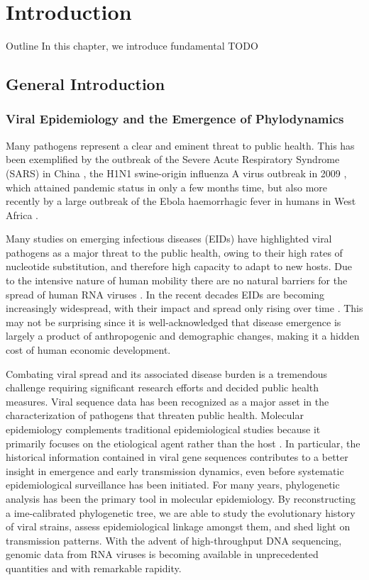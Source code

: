 \chapter{Introduction}

\begin{remark}{Outline}
In this chapter, we introduce fundamental 
TODO
\end{remark}

\section{General Introduction}

\subsection{Viral Epidemiology and the Emergence of Phylodynamics\label{sub:epidemiology}}

Many pathogens represent a clear and eminent threat to public health. 
This has been exemplified by 
the outbreak of the Severe Acute Respiratory Syndrome (SARS) in China \citep{Ksiazek2003},
the H1N1 swine-origin influenza A virus outbreak in 2009 \citep{Fraser2009},
which attained pandemic status in only a few months time, but also more recently by a large outbreak of the Ebola haemorrhagic fever in humans in West Africa \citep{Dudas2014}. 

Many studies on emerging infectious diseases (EIDs) have highlighted viral pathogens as a major threat to the public health, owing to their high rates of nucleotide substitution, and therefore high capacity to adapt to new hosts. 
Due to the intensive nature of human mobility there are no natural barriers for the spread of human RNA viruses \citep{Brockmann2006}.
In the recent decades EIDs are becoming increasingly widespread, with their impact and spread only rising over time \citep{Jones2008}.
This may not be surprising since it is well-acknowledged that disease emergence is largely a product of anthropogenic and demographic changes, making it a hidden cost of human economic development.
 
Combating viral spread and its associated disease burden is a tremendous challenge requiring significant research efforts and decided public health measures. 
Viral sequence data has been recognized as a major asset in the characterization of pathogens that threaten public health.
Molecular epidemiology complements traditional epidemiological studies because it primarily focuses on the etiological agent rather than the host \citep{Leitner2002}.
In particular, the historical information contained in viral gene sequences contributes to a better insight in emergence and early transmission dynamics, even before systematic epidemiological surveillance has been initiated. 
For many years, phylogenetic analysis has been the primary tool in molecular epidemiology. 
By reconstructing a ime-calibrated phylogenetic tree, we are able to study the evolutionary history of viral strains, assess epidemiological linkage amongst them, and shed light on transmission patterns. 
With the advent of high-throughput DNA sequencing, genomic data from RNA viruses is becoming available in unprecedented quantities and with remarkable rapidity. 

